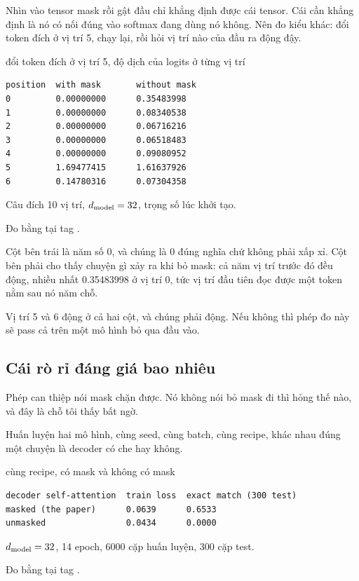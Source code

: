 %
Nhìn vào tensor mask rồi gật đầu chỉ khẳng định được cái tensor. Cái cần khẳng
định là nó có nối đúng vào softmax đang dùng nó không. Nên đo kiểu khác: đổi
token đích ở vị trí 5, chạy lại, rồi hỏi vị trí nào của đầu ra động đậy.

\begin{measured}{đổi token đích ở vị trí 5, độ dịch của logits ở từng vị trí}
\begin{verbatim}
position  with mask       without mask
0         0.00000000      0.35483998
1         0.00000000      0.08340538
2         0.00000000      0.06716216
3         0.00000000      0.06518483
4         0.00000000      0.09080952
5         1.69477415      1.61637926
6         0.14780316      0.07304358
\end{verbatim}

Câu đích 10 vị trí, \(d_{\mathrm{model}} = 32\), trọng số lúc khởi tạo.

Đo bằng  tại tag .
\end{measured}

Cột bên trái là năm số 0, và chúng là 0 đúng nghĩa chứ không phải xấp xỉ. Cột
bên phải cho thấy chuyện gì xảy ra khi bỏ mask: cả năm vị trí trước đó đều
động, nhiều nhất 0.35483998 ở vị trí 0, tức vị trí đầu tiên đọc được một token
nằm sau nó năm chỗ.

Vị trí 5 và 6 động ở cả hai cột, và chúng phải động. Nếu không thì phép đo này
sẽ pass cả trên một mô hình bỏ qua đầu vào.

\subsection*{Cái rò rỉ đáng giá bao nhiêu}

%
Phép can thiệp nói mask chặn được. Nó không nói bỏ mask đi thì hỏng thế nào, và
đây là chỗ tôi thấy bất ngờ.

Huấn luyện hai mô hình, cùng seed, cùng batch, cùng recipe, khác nhau đúng một
chuyện là decoder có che hay không.

\begin{measured}{cùng recipe, có mask và không có mask}
\begin{verbatim}
decoder self-attention  train loss  exact match (300 test)
masked (the paper)      0.0639      0.6533
unmasked                0.0434      0.0000
\end{verbatim}

\(d_{\mathrm{model}} = 32\), 14 epoch, 6000 cặp huấn luyện, 300 cặp test.

Đo bằng  tại tag .
\end{measured}

